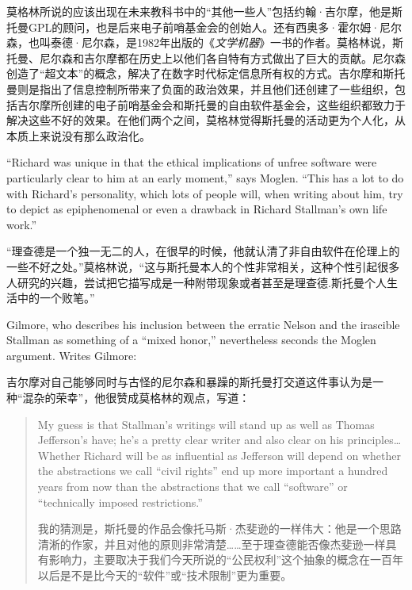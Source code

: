 \ifdefined\chs
莫格林所说的应该出现在未来教科书中的``其他一些人''包括约翰·吉尔摩，他是斯托曼GPL的顾问，也是后来电子前哨基金会的创始人。还有西奥多·霍尔姆·尼尔森，也叫泰德·尼尔森，是1982年出版的《\textit{文学机器}》一书的作者。莫格林说，斯托曼、尼尔森和吉尔摩都在历史上以他们各自特有方式做出了巨大的贡献。尼尔森创造了``超文本''的概念，解决了在数字时代标定信息所有权的方式。吉尔摩和斯托曼则是指出了信息控制所带来了负面的政治效果，并且他们还创建了一些组织，包括吉尔摩所创建的电子前哨基金会和斯托曼的自由软件基金会，这些组织都致力于解决这些不好的效果。在他们两个之间，莫格林觉得斯托曼的活动更为个人化，从本质上来说没有那么政治化。
\fi

\ifdefined\eng
``Richard was unique in that the ethical implications of unfree software were particularly clear to him at an early moment,'' says Moglen. ``This has a lot to do with Richard's personality, which lots of people will, when writing about him, try to depict as epiphenomenal or even a drawback in Richard Stallman's own life work.''
\fi

\ifdefined\chs
``理查德是一个独一无二的人，在很早的时候，他就认清了非自由软件在伦理上的一些不好之处。''莫格林说，``这与斯托曼本人的个性非常相关，这种个性引起很多人研究的兴趣，尝试把它描写成是一种附带现象或者甚至是理查德.斯托曼个人生活中的一个败笔。''
\fi

\ifdefined\eng
Gilmore, who describes his inclusion between the erratic Nelson and the irascible Stallman as something of a ``mixed honor,'' nevertheless seconds the Moglen argument. Writes Gilmore:
\fi

\ifdefined\chs
吉尔摩对自己能够同时与古怪的尼尔森和暴躁的斯托曼打交道这件事认为是一种``混杂的荣幸''，他很赞成莫格林的观点，写道：
\fi

\begin{quote}
\ifdefined\eng
My guess is that Stallman's writings will stand up as well as Thomas Jefferson's have; he's a pretty clear writer and also clear on his principles\ldots Whether Richard will be as influential as Jefferson will depend on whether the abstractions we call ``civil rights'' end up more important a hundred years from now than the abstractions that we call ``software'' or ``technically imposed restrictions.''
\fi

\ifdefined\chs
我的猜测是，斯托曼的作品会像托马斯·杰斐逊的一样伟大：他是一个思路清淅的作家，并且对他的原则非常清楚……至于理查德能否像杰斐逊一样具有影响力，主要取决于我们今天所说的``公民权利''这个抽象的概念在一百年以后是不是比今天的``软件''或``技术限制''更为重要。
\fi
\end{quote}

